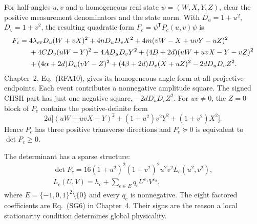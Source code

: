 For half-angles $u,v$ and a homogeneous real state
$\psi=(W,X,Y,Z)$, clear the positive measurement denominators and
the state norm. With $D_u=1+u^2$, $D_v=1+v^2$, the resulting
quadratic form $F_c=\psi^{\mathsf T}P_c(u,v)\psi$ is
\begin{align}
 F_c={}&4\lambda_{\rm ev}D_u(W+vX)^2+4nD_uD_vX^2
             +4m(vW-X+uvY-uZ)^2\notag\\
 &+4CD_v(uW-Y)^2+4AD_uD_vY^2
             +(4D+2d)(uW+uvX-Y-vZ)^2\notag\\
 &+(4\alpha+2d)D_u(vY-Z)^2
             +(4\beta+2d)D_v(X+uZ)^2-2dD_uD_vZ^2.
 \label{eq:insight-parent}
\end{align}
Chapter~2, Eq.~(RFA10), gives its homogeneous angle
form at all projective endpoints. Each event contributes a
nonnegative amplitude square. The signed CHSH part has just one
negative square, $-2dD_uD_vZ^2$. For $uv\ne0$, the $Z=0$ block
of $P_c$ contains the positive-definite form
\begin{equation}\label{eq:insight-transverse}
 2d\bigl[(uW+uvX-Y)^2+(1+u^2)v^2Y^2+(1+v^2)X^2\bigr].
\end{equation}
Hence $P_c$ has three positive transverse directions and
$P_c\succeq0$ is equivalent to $\det P_c\ge0$.

The determinant has a sparse structure:
\begin{equation}\label{eq:insight-determinant}
 \begin{gathered}
 \det P_c=16(1+u^2)^2(1+v^2)^2u^2v^2L_c(u^2,v^2),\\
 L_c(U,V)=h_c+\sum_{e\in E}q_eU^{e_1}V^{e_2},
 \end{gathered}
\end{equation}
where $E=\{-1,0,1\}^2\setminus\{0\}$ and every $q_e$ is
nonnegative. The eight factored coefficients are Eq.~(SG6) in
Chapter~4. Their signs are the reason a local
stationarity condition determines global physicality.

